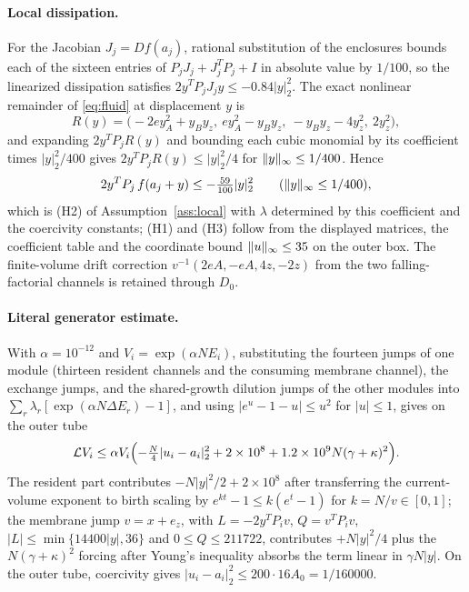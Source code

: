 \paragraph{Local dissipation.}
For the Jacobian $J_j=Df(a_j)$, rational substitution of the enclosures bounds each of the sixteen entries of $P_jJ_j+J_j^TP_j+I$ in absolute value by $1/100$, so the linearized dissipation satisfies $2y^TP_jJ_jy\le-0.84|y|_2^2$. The exact nonlinear remainder of \eqref{eq:fluid} at displacement $y$ is
\[
 R(y)=\bigl(-2ey_A^2+y_By_z,\ ey_A^2-y_By_z,\ -y_By_z-4y_z^2,\ 2y_z^2\bigr),
\]
and expanding $2y^TP_jR(y)$ and bounding each cubic monomial by its coefficient times $|y|_2^2/400$ gives $2y^TP_jR(y)\le|y|_2^2/4$ for $\lVert y\rVert_\infty\le1/400$. Hence
\[
 2y^TP_j\,f(a_j+y)\le-\tfrac{59}{100}|y|_2^2\qquad(\lVert y\rVert_\infty\le1/400),
\]
which is (H2) of Assumption~\ref{ass:local} with $\lambda$ determined by this coefficient and the coercivity constants; (H1) and (H3) follow from the displayed matrices, the coefficient table and the coordinate bound $\lVert u\rVert_\infty\le35$ on the outer box. The finite-volume drift correction $v^{-1}(2eA,-eA,4z,-2z)$ from the two falling-factorial channels is retained through $D_0$.

\paragraph{Literal generator estimate.}
With $\alpha=10^{-12}$ and $V_i=\exp(\alpha NE_i)$, substituting the fourteen jumps of one module (thirteen resident channels and the consuming membrane channel), the exchange jumps, and the shared-growth dilution jumps of the other modules into $\sum_r\lambda_r[\exp(\alpha N\Delta E_r)-1]$, and using $|e^u-1-u|\le u^2$ for $|u|\le1$, gives on the outer tube
\[
 \mathcal L V_i\le\alpha V_i\Bigl(-\tfrac N4|u_i-a_i|_2^2+2\times10^8+1.2\times10^9N(\gamma+\kappa)^2\Bigr).
\]
The resident part contributes $-N|y|^2/2+2\times10^8$ after transferring the current-volume exponent to birth scaling by $e^{kt}-1\le k(e^t-1)$ for $k=N/v\in[0,1]$; the membrane jump $v=x+e_z$, with $L=-2y^TP_iv$, $Q=v^TP_iv$, $|L|\le\min\{14400|y|,36\}$ and $0\le Q\le211722$, contributes $+N|y|^2/4$ plus the $N(\gamma+\kappa)^2$ forcing after Young's inequality absorbs the term linear in $\gamma N|y|$. On the outer tube, coercivity gives $|u_i-a_i|_2^2\le200\cdot16A_0=1/160000$.

